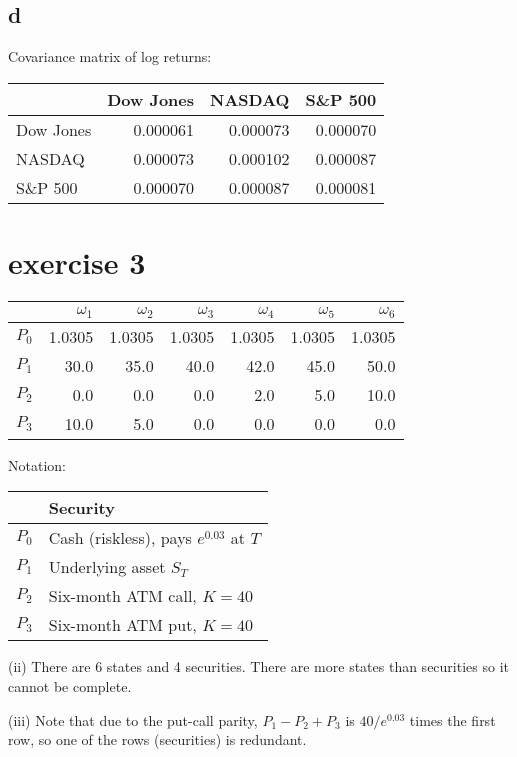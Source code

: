 \documentclass{article}
\begin{document}
\subsection{d}
Covariance matrix of log returns:

\begin{tabular}{lrrr}
    \toprule
              & Dow Jones & NASDAQ   & S\&P 500 \\
    \midrule
    Dow Jones & 0.000061  & 0.000073 & 0.000070 \\
    NASDAQ    & 0.000073  & 0.000102 & 0.000087 \\
    S\&P 500  & 0.000070  & 0.000087 & 0.000081 \\
    \bottomrule
\end{tabular}

\section{exercise 3}

\begin{tabular}{lrrrrrr}
    \toprule
          & $\omega_1$ & $\omega_2$ & $\omega_3$ & $\omega_4$ & $\omega_5$ & $\omega_6$ \\
    \midrule
    $P_0$ & 1.0305     & 1.0305     & 1.0305     & 1.0305     & 1.0305     & 1.0305     \\
    $P_1$ & 30.0       & 35.0       & 40.0       & 42.0       & 45.0       & 50.0       \\
    $P_2$ & 0.0        & 0.0        & 0.0        & 2.0        & 5.0        & 10.0       \\
    $P_3$ & 10.0       & 5.0        & 0.0        & 0.0        & 0.0        & 0.0        \\
    \bottomrule
\end{tabular}

Notation:

\begin{tabular}{ll}
    \toprule
          & Security                                \\
    \midrule
    $P_0$ & Cash (riskless), pays $e^{0.03}$ at $T$ \\
    $P_1$ & Underlying asset $S_T$                  \\
    $P_2$ & Six-month ATM call, $K=40 $             \\
    $P_3$ & Six-month ATM put, $K=40 $              \\
    \bottomrule
\end{tabular}

(ii) There are 6 states and 4 securities. There are more states than securities so it cannot be complete.

(iii) Note that due to the put-call parity, $P_1 - P_2 + P_3$ is $40/e^{0.03}$ times the first row, so one of the rows (securities) is redundant.
\end{document}
